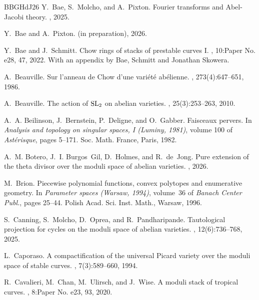 \documentclass[11pt]{article}
\theoremstyle{definition}
\begin{document}
\begin{thebibliography}{BBGHdJ26}
Y.~Bae, S.~Molcho, and A.~Pixton.
\newblock Fourier transforms and {A}bel-{J}acobi theory.
, 2025.

Y.~Bae and A.~Pixton.
\newblock (in preparation), 2026.

Y.~Bae and J.~Schmitt.
\newblock Chow rings of stacks of prestable curves {I}.
, 10:Paper No. e28, 47, 2022.
\newblock With an appendix by Bae, Schmitt and Jonathan Skowera.

A.~Beauville.
\newblock Sur l'anneau de {C}how d'une vari\'{e}t\'{e} ab\'{e}lienne.
, 273(4):647--651, 1986.

A.~Beauville.
\newblock The action of {$\rm SL_2$} on abelian varieties.
, 25(3):253--263, 2010.

A.~A. Beilinson, J.~Bernstein, P.~Deligne, and O.~Gabber.
\newblock Faisceaux pervers.
\newblock In {\em Analysis and topology on singular spaces, {I} ({L}uminy, 1981)}, volume 100 of {\em Ast\'erisque}, pages 5--171. Soc. Math. France, Paris, 1982.

A.~M. Botero, J.~I. Burgos~Gil, D.~Holmes, and R.~de~Jong.
\newblock Pure extension of the theta divisor over the moduli space of abelian varieties.
, 2026.

M.~Brion.
\newblock Piecewise polynomial functions, convex polytopes and enumerative geometry.
\newblock In {\em Parameter spaces ({W}arsaw, 1994)}, volume~36 of {\em Banach Center Publ.}, pages 25--44. Polish Acad. Sci. Inst. Math., Warsaw, 1996.

S.~Canning, S.~Molcho, D.~Oprea, and R.~Pandharipande.
\newblock Tautological projection for cycles on the moduli space of abelian varieties.
, 12(6):736--768, 2025.

L.~Caporaso.
\newblock A compactification of the universal {P}icard variety over the moduli space of stable curves.
, 7(3):589--660, 1994.

R.~Cavalieri, M.~Chan, M.~Ulirsch, and J.~Wise.
\newblock A moduli stack of tropical curves.
, 8:Paper No. e23, 93, 2020.


\end{thebibliography}
\end{document}
